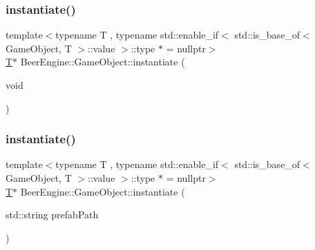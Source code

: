\mbox{\label{class_beer_engine_1_1_game_object_ab88b7ff5e8aab52e54c02f9d103bbfcf}} 
\subsubsection{\texorpdfstring{instantiate()}{instantiate()}\hspace{0.1cm}{\footnotesize\ttfamily [1/2]}}
{\footnotesize\ttfamily template$<$typename T , typename std\+::enable\+\_\+if$<$ std\+::is\+\_\+base\+\_\+of$<$ Game\+Object, T $>$\+::value $>$\+::type $\ast$  = nullptr$>$ \\
\mbox{\hyperlink{namespace_beer_engine_a94f0b552f6dc910de8cdb44207981f53a8de48e594408f9fc561b2f68ce05f664}{T}}$\ast$ Beer\+Engine\+::\+Game\+Object\+::instantiate (\begin{DoxyParamCaption}\item[{void}]{ }\end{DoxyParamCaption})\hspace{0.3cm}{\ttfamily [inline]}}

\mbox{\label{class_beer_engine_1_1_game_object_ad523cd5783c0bfda02a9077af646e25b}} 
\subsubsection{\texorpdfstring{instantiate()}{instantiate()}\hspace{0.1cm}{\footnotesize\ttfamily [2/2]}}
{\footnotesize\ttfamily template$<$typename T , typename std\+::enable\+\_\+if$<$ std\+::is\+\_\+base\+\_\+of$<$ Game\+Object, T $>$\+::value $>$\+::type $\ast$  = nullptr$>$ \\
\mbox{\hyperlink{namespace_beer_engine_a94f0b552f6dc910de8cdb44207981f53a8de48e594408f9fc561b2f68ce05f664}{T}}$\ast$ Beer\+Engine\+::\+Game\+Object\+::instantiate (\begin{DoxyParamCaption}\item[{std\+::string}]{prefab\+Path }\end{DoxyParamCaption})\hspace{0.3cm}{\ttfamily [inline]}}


